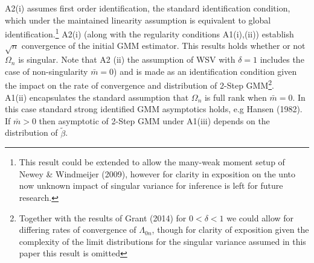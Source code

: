 \documentclass[11pt, fleqn]{article}
\begin{document}
   A2(i) assumes first order identification, the standard identification condition, which under the maintained linearity assumption is equivalent to global identification.\footnote{ This result  could be extended to allow the many-weak moment setup of Newey \& Windmeijer (2009), however for clarity in exposition on the unto now unknown impact of singular variance for inference is left for future research.}   A2(i) (along with the regularity conditions A1(i),(ii)) establish  $\sqrt{n}$ convergence of the initial GMM estimator. This results holds whether or not $\Omega_n$  is singular. Note that A2 (ii) the assumption of WSV with $\delta=1$  includes the case of non-singularity $\bar{m}=0$) and is made as an identification condition given the impact on the rate of convergence and distribution of 2-Step GMM\footnote{Together with the results of Grant (2014) for $0<\delta<1$ we could allow for differing rates of convergence of $\Lambda_{0n}$, though for clarity of exposition given the complexity of the limit distributions for the singular variance assumed in this paper this result is omitted}. \\
A1(ii) encapsulates the standard assumption that $\Omega_n$ is full rank when $\bar{m}=0$. In this case  standard strong identified GMM asymptotics holds, e.g Hansen (1982).  If $\bar{m}>0$ then asymptotic of 2-Step GMM under A1(iii) depends on the distribution of $\tilde{\beta}$. \\
\end{document}
